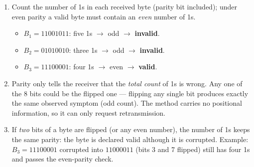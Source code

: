 \documentclass[11pt]{article}
\begin{document}
\begin{corrige}
\begin{enumerate}
\item Count the number of 1s in each received byte (parity bit included); under even parity a valid byte must contain an \emph{even} number of 1s.
\begin{itemize}
\item $B_1 = 11001011$: five 1s $\rightarrow$ odd $\rightarrow$ \textbf{invalid}.
\item $B_2 = 01010010$: three 1s $\rightarrow$ odd $\rightarrow$ \textbf{invalid}.
\item $B_3 = 11100001$: four 1s $\rightarrow$ even $\rightarrow$ \textbf{valid}.
\end{itemize}
\item Parity only tells the receiver that the \emph{total count} of 1s is wrong. Any one of the 8 bits could be the flipped one — flipping any single bit produces exactly the same observed symptom (odd count). The method carries no positional information, so it can only request retransmission.
\item If \emph{two} bits of a byte are flipped (or any even number), the number of 1s keeps the same parity: the byte is declared valid although it is corrupted. Example: $B_3 = 11100001$ corrupted into $11000011$ (bits 3 and 7 flipped) still has four 1s and passes the even-parity check.
\end{enumerate}
\end{corrige}
\end{document}
